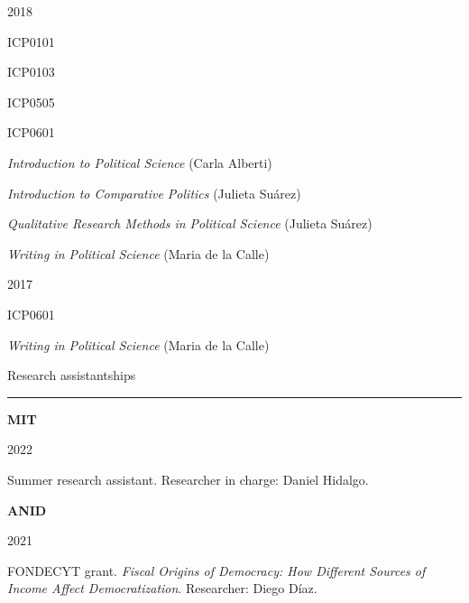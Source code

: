 \documentclass[a4paper, 12pt]{article}
\begin{document}
\begin{multicols}{3}

2018

\columnbreak

ICP0101

ICP0103

ICP0505

ICP0601

\columnbreak

\textit{Introduction to Political Science} (Carla Alberti)

\textit{Introduction to Comparative Politics} (Julieta Suárez)

\textit{Qualitative Research Methods in Political Science} (Julieta Suárez)

\textit{Writing in Political Science} (Maria de la Calle)

\end{multicols}


\begin{multicols}{3}

2017

\columnbreak

ICP0601

\columnbreak

\textit{Writing in Political Science} (Maria de la Calle)

\end{multicols}




\large Research assistantships
\smallskip
\hrule
\normalsize


\begin{multicols}{3}

\textbf{MIT}

\columnbreak

2022

\columnbreak

Summer research assistant. Researcher in charge: Daniel Hidalgo.

\end{multicols}


\begin{multicols}{3}

\textbf{ANID}

\columnbreak

2021

\columnbreak

FONDECYT grant. \textit{Fiscal Origins of Democracy: How Different Sources of Income Affect Democratization}. Researcher: Diego Díaz.

\end{multicols}
\end{document}
